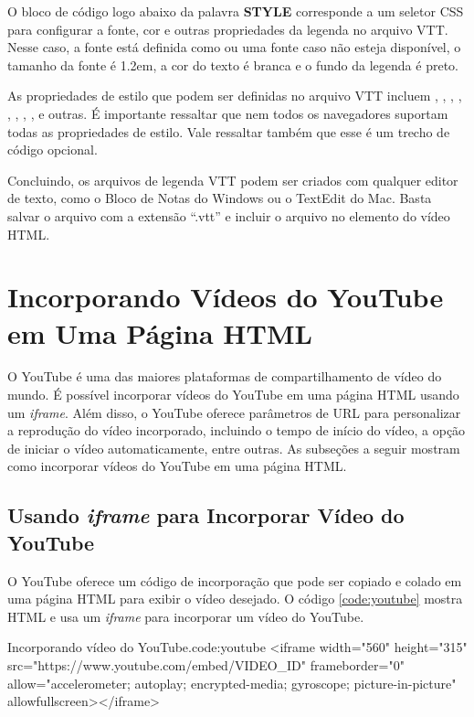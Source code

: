 O bloco de código logo abaixo da palavra \textbf{STYLE} corresponde a um seletor CSS para configurar a fonte, cor e outras propriedades da legenda no arquivo VTT. Nesse caso, a fonte está definida como  ou uma fonte  caso  não esteja disponível, o tamanho da fonte é 1.2em, a cor do texto é branca e o fundo da legenda é preto.

As propriedades de estilo que podem ser definidas no arquivo VTT incluem , , , , , , , ,  e outras. É importante ressaltar que nem todos os navegadores suportam todas as propriedades de estilo. Vale ressaltar também que esse é um trecho de código opcional. 

Concluindo, os arquivos de legenda VTT podem ser criados com qualquer editor de texto, como o Bloco de Notas do Windows ou o TextEdit do Mac. Basta salvar o arquivo com a extensão ``.vtt'' e incluir o arquivo no elemento  do vídeo HTML.

\section{Incorporando Vídeos do YouTube em Uma Página HTML}

O YouTube é uma das maiores plataformas de compartilhamento de vídeo do mundo. É possível incorporar vídeos do YouTube em uma página HTML usando um \textit{iframe}. Além disso, o YouTube oferece parâmetros de URL para personalizar a reprodução do vídeo incorporado, incluindo o tempo de início do vídeo, a opção de iniciar o vídeo automaticamente, entre outras. As subseções a seguir mostram como incorporar vídeos do YouTube em uma página HTML.

\subsection{Usando \textit{iframe} para Incorporar Vídeo do YouTube}

O YouTube oferece um código de incorporação que pode ser copiado e colado em uma página HTML para exibir o vídeo desejado. O código \ref{code:youtube} mostra HTML e usa um \textit{iframe} para incorporar um vídeo do YouTube.

\begin{htmlcode}{Incorporando vídeo do YouTube.}{code:youtube}
<iframe width="560" height="315" src="https://www.youtube.com/embed/VIDEO_ID"
  frameborder="0" allow="accelerometer; autoplay; encrypted-media; gyroscope;
  picture-in-picture" allowfullscreen></iframe>
\end{htmlcode}

